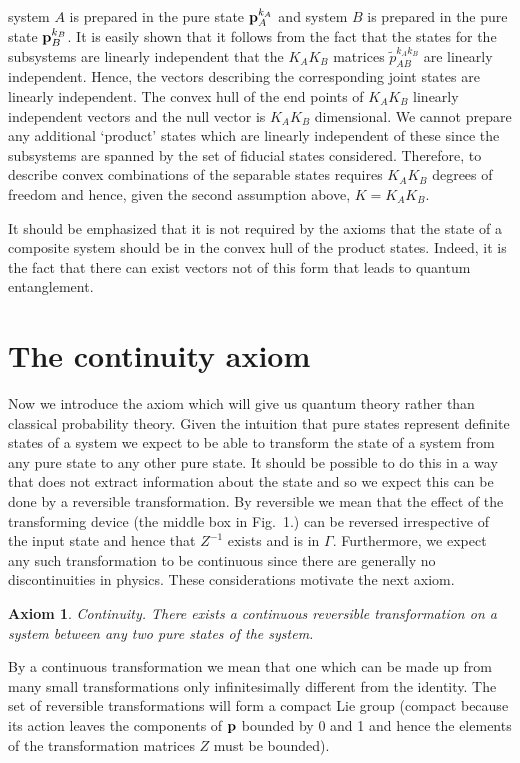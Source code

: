 \documentclass[10pt,twocolumn]{article}
\newtheorem{axiom}{Axiom}
\begin{document}
system $A$ is prepared in the pure state ${\bf p}^{k_A}_A$ and system $B$ is
prepared in the pure state ${\bf p}^{k_B}_B$.  It is easily
shown that it follows
from the fact that the states for the subsystems are linearly
independent that the $K_AK_B$ matrices $\tilde{p}_{AB}^{k_Ak_B}$ are linearly
independent. Hence, the vectors describing the corresponding joint
states are linearly independent.  The convex hull of the end points of
$K_AK_B$ linearly
independent vectors and the null vector is $K_AK_B$ dimensional. We
cannot prepare any additional `product' states which are linearly
independent of these since the subsystems are spanned by the set of
fiducial states considered.
Therefore, to describe convex combinations of the separable states
requires $K_AK_B$ degrees of freedom and hence, given the second
assumption above, $K=K_AK_B$.

It should be emphasized that it is not required by the axioms that the
state of a composite system should be in the convex hull of
the product states. Indeed, it
is the fact that there can exist vectors not of this form that leads to
quantum entanglement.

\section{The continuity axiom}\label{axiomfive}

Now we introduce the axiom which will give us quantum theory rather than
classical probability theory.
Given the intuition that pure states represent definite states of a
system we expect to be able to transform the state of a system
from any pure state to any other pure state.  It should be possible to
do this in a way that does not extract information about the state and
so we expect this can be done by a reversible transformation.
By reversible we mean that the effect of the transforming device
(the middle box in Fig.\ 1.) can be reversed irrespective of the input
state and hence that $Z^{-1}$ exists and is in $\Gamma$.
Furthermore, we expect any such transformation to be continuous since
there are generally no discontinuities in physics.
These considerations motivate the next axiom.
\begin{axiom}
{\rm Continuity}.
There exists a continuous reversible transformation on a system between
any two pure states of the system.
\end{axiom}
By a continuous transformation we mean that one which can be made up from many
small transformations only infinitesimally different from the identity.
The set of reversible transformations will form a compact Lie group
(compact because its action leaves the components of ${\bf p}$ bounded by
0 and 1 and hence the elements of the transformation matrices $Z$ must
be bounded).
\end{document}
